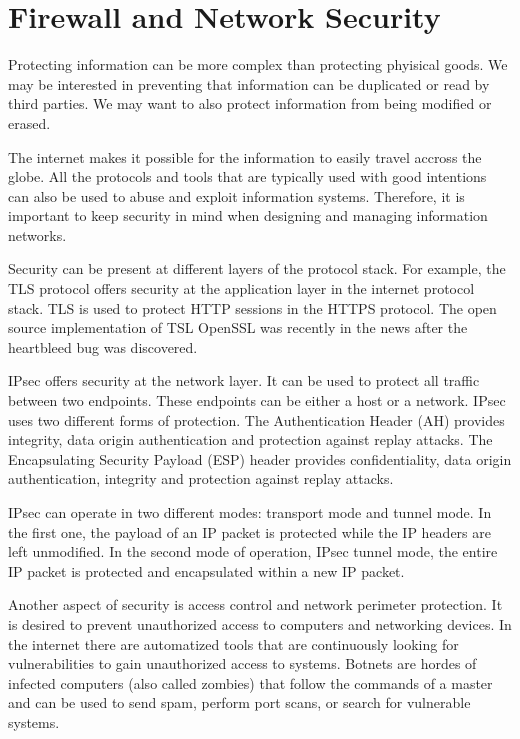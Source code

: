 \chapter{Firewall and Network Security}

Protecting information can be more complex than protecting phyisical goods.
We may be interested in preventing that information can be duplicated or read by third parties.
We may want to also protect information from being modified or erased.

The internet makes it possible for the information to easily travel accross the globe.
All the protocols and tools that are typically used with good intentions can also be used to abuse and exploit information systems.
Therefore, it is important to keep security in mind when designing and managing information networks.

Security can be present at different layers of the protocol stack.
For example, the TLS protocol offers security at the application layer in the internet protocol stack.
TLS is used to protect HTTP sessions in the HTTPS protocol. 
The open source implementation of TSL OpenSSL was recently in the news after the heartbleed bug was discovered.

IPsec offers security at the network layer.
It can be used to protect all traffic between two endpoints.
These endpoints can be either a host or a network.
IPsec uses two different forms of protection.
The Authentication Header (AH) provides integrity, data origin authentication and protection against replay attacks.
The Encapsulating Security Payload (ESP) header provides confidentiality, data origin authentication, integrity and protection against replay attacks.

IPsec can operate in two different modes: transport mode and tunnel mode.
In the first one, the payload of an IP packet is protected while the IP headers are left unmodified.
In the second mode of operation, IPsec tunnel mode, the entire IP packet is protected and encapsulated within a new IP packet.

Another aspect of security is access control and network perimeter protection.
It is desired to prevent unauthorized access to computers and networking devices.
In the internet there are automatized tools that are continuously looking for vulnerabilities to gain unauthorized access to systems.
Botnets are hordes of infected computers (also called zombies) that follow the commands of a master and can be used to send spam, perform port scans, or search for vulnerable systems.

